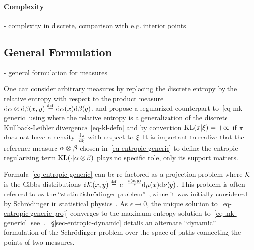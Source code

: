 
 
\paragraph{Complexity}
 
 
- complexity in discrete, comparison with e.g. interior points

\subsection{General Formulation}

- general formulation for measures

One can consider arbitrary measures by replacing the discrete entropy by the relative entropy with respect to the product measure $\mathrm{d}\alpha\otimes\mathrm{d}\beta(x,y) \stackrel{\mbox{\upshape\tiny def.}}{=} \mathrm{d}\alpha(x)\mathrm{d}\beta(y)$, and propose a regularized counterpart to~\eqref{eq-mk-generic} using
where the relative entropy is a generalization of the discrete Kullback-Leibler divergence~\eqref{eq-kl-defn}
and by convention $\operatorname{KL}(\pi|\xi)=+\infty$ if $\pi$ does not have a density $\frac{\mathrm{d} \pi}{\mathrm{d}\xi}$ with respect to $\xi$. 
%
It is important to realize that the reference measure $\alpha\otimes\beta$ chosen in~\eqref{eq-entropic-generic} to define the entropic regularizing term $\operatorname{KL}(\cdot|\alpha\otimes\beta)$ plays no specific role, only its support matters.

Formula~\eqref{eq-entropic-generic} can be re-factored as a projection problem
\eql{\label{eq-entropic-generic-proj}
	\umin{\pi \in \Couplings(\al,\be)} \KL(\pi|\Kk)
}
where $\mathcal{K}$ is the Gibbs distributions $\mathrm{d}\mathcal{K}(x,y) \stackrel{\mbox{\upshape\tiny def.}}{=} e^{-\frac{c(x,y)}{\varepsilon}} \mathrm{d}\mu(x)\mathrm{d}\nu(y)$.
%
This problem is often referred to as the ``static Schr\"odinger problem''~\cite{LeonardSchroedinger,RuschendorfThomsen}, since it was initially considered by Schr\"odinger in statistical physics~\cite{Schroedinger31}. 
%
As $\epsilon \rightarrow 0$, the unique solution to~\eqref{eq-entropic-generic-proj} converges to the maximum entropy solution to~\eqref{eq-mk-generic}, see~\cite{leonard2012schrodinger,2017-carlier-SIMA}.
%
~\S\ref{sec-entropic-dynamic} details an alternate ``dynamic'' formulation of the Schr\"odinger problem over the space of paths connecting the points of two measures.

